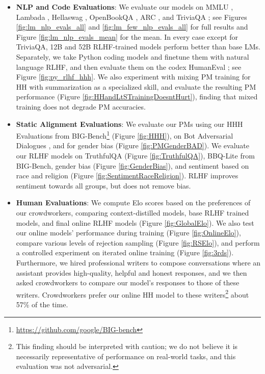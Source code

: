 \begin{itemize}
    \item {\bf NLP and Code Evaluations}:  We evaluate our models on MMLU \cite{hendrycks2021measuring}, Lambada \cite{paperno2016lambada}, Hellaswag \cite{zellers2019hellaswag}, OpenBookQA \cite{Mihaylov2018CanAS}, ARC \cite{Clark2018ThinkYH}, and TriviaQA \cite{joshi2017triviaqa}; see Figures \ref{fig:lm_nlp_evals_all} and \ref{fig:lm_few_nlp_evals_all} for full results and Figure \ref{fig:lm_nlp_evals_mean} for the mean.  In every case except for TriviaQA, 12B and 52B RLHF-trained models perform better than base LMs.  Separately, we take Python coding models and finetune them with natural language RLHF, and then evaluate them on the codex HumanEval \cite{chen2021codex}; see Figure \ref{fig:py_rlhf_hhh}.   We also experiment with mixing PM training for HH with summarization \cite{stiennon2020learning} as a specialized skill, and evaluate the resulting PM performance (Figure \ref{fig:HHandLtSTrainingDoesntHurt}), finding that mixed training does not degrade PM accuracies.
    \item {\bf Static Alignment Evaluations}:  We evaluate our PMs using our HHH Evaluations \cite{askell2021general} from BIG-Bench\footnote{\url{https://github.com/google/BIG-bench}} (Figure \ref{fig:HHH}), on Bot Adversarial Dialogues \cite{BAD}, and for gender bias \cite{Gopher} (Figure \ref{fig:PMGenderBAD}).  We evaluate our RLHF models on TruthfulQA \cite{lin2021truthfulqa} (Figure \ref{fig:TruthfulQA}), BBQ-Lite \cite{BBQA} from BIG-Bench, gender bias  (Figure \ref{fig:GenderBias}), and sentiment based on race and religion \cite{Gopher} (Figure \ref{fig:SentimentRaceReligion}). RLHF improves sentiment towards all groups, but does not remove bias. 
    \item {\bf Human Evaluations}:  We compute Elo scores based on the preferences of our crowdworkers, comparing context-distilled models, base RLHF trained models, and final online RLHF models (Figure \ref{fig:GlobalElo}).  We also test our online models' performance during training (Figure \ref{fig:OnlineElo}), compare various levels of rejection sampling (Figure \ref{fig:RSElo}), and perform a controlled experiment on iterated online training (Figure \ref{fig:3rds}). Furthermore, we hired professional writers to compose conversations where an assistant provides high-quality, helpful and honest responses, and we then asked  crowdworkers to  compare our model's responses to those of these writers.  Crowdworkers prefer our online HH model to these writers\footnote{This finding should be interpreted with caution; we do not believe it is necessarily representative of performance on real-world tasks, and this evaluation was not adversarial.} about 57\% of the time.

\end{itemize}
